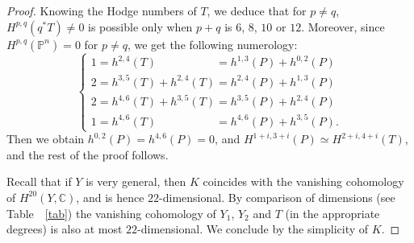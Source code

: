 \documentclass[JEP,XML,SOM,Unicode,NoEqCountersInSection]{cedram}
\theoremstyle{plain}
\theoremstyle{definition}
\newcommand{\CC}{\mathbb{C}}
\newcommand{\PP}{\mathbb{P}}
\begin{document}
\begin{proof}
Knowing the Hodge numbers of $T$, we deduce that for $p \neq q$, $H^{p,q}(q^*T)\neq 0$ is possible only when $p+q$ is $6$, $8$, $10$ or $12$. Moreover, since $H^{p,q}(\PP^n)=0$ for $p \neq q$, we get the following numerology:
\[
\begin{cases}
1 = h^{2,4}(T)\phantom{{}+h^{2,4}(T)} = h^{1,3}(P)+h^{0,2}(P)\\
2 = h^{3,5}(T)+h^{2,4}(T) = h^{2,4}(P)+h^{1,3}(P)\\
2 = h^{4,6}(T)+h^{3,5}(T) = h^{3,5}(P)+h^{2,4}(P)\\
1 = h^{4,6}(T)\phantom{{}+h^{2,4}(T)} = h^{4,6}(P)+h^{3,5}(P).
\end{cases}
\]
Then we obtain $h^{0,2}(P)=h^{4,6}(P)=0$, and $H^{1+i,3+i}(P) \simeq H^{2+i,4+i}(T)$, and the rest of the proof follows.

Recall that if $Y$ is very general, then $K$ coincides with the vanishing cohomology of $H^{20}(Y,\CC)$,
and is hence $22$-dimensional. By comparison of dimensions (see Table~ \ref{tab}) the vanishing cohomology
of $Y_1$, $Y_2$ and $T$ (in the appropriate degrees) is also at most $22$-dimensional.
We conclude by the
simplicity of $K$.
\end{proof}
\end{document}
